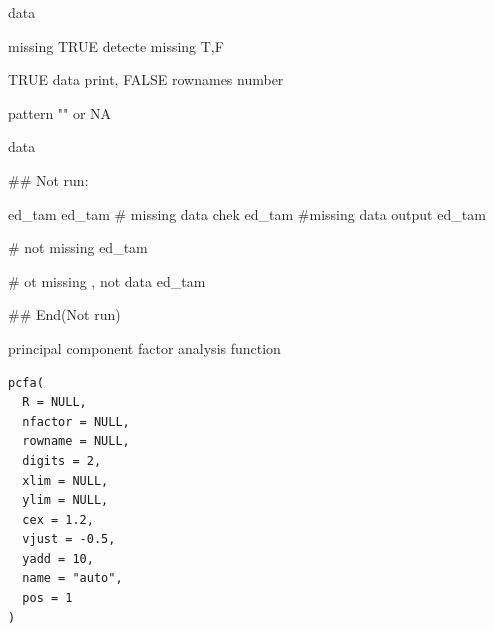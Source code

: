 \documentclass[a4paper]{book}
\begin{document}
\begin{Arguments}
\begin{ldescription}
\item[\code{df}] data

\item[\code{missing}] missing TRUE detecte missing T,F

\item[\code{data}] TRUE data print, FALSE rownames number

\item[\code{pattern}] pattern "" or  NA
\end{ldescription}
\end{Arguments}
%
\begin{Value}
data
\end{Value}
%
\begin{Examples}
\begin{ExampleCode}

\#\# Not run: 

ed_tam %
ed_tam %
# missing data chek
ed_tam %
#missing data output
ed_tam %

# not missing
ed_tam %

# ot missing , not data
ed_tam %



## End(Not run)


\end{ExampleCode}
\end{Examples}
%
\begin{Description}
principal component factor analysis function
\end{Description}
%
\begin{Usage}
\begin{verbatim}
pcfa(
  R = NULL,
  nfactor = NULL,
  rowname = NULL,
  digits = 2,
  xlim = NULL,
  ylim = NULL,
  cex = 1.2,
  vjust = -0.5,
  yadd = 10,
  name = "auto",
  pos = 1
)
\end{verbatim}
\end{Usage}
%
\end{document}

